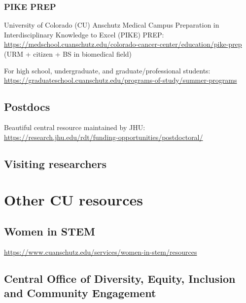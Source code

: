 \documentclass[
  letterpaper,
  DIV=11,
  numbers=noendperiod]{scrreprt}
\begin{document}
\hypertarget{pike-prep}{%
\subsection{PIKE PREP}\label{pike-prep}}

University of Colorado (CU) Anschutz Medical Campus Preparation in
Interdisciplinary Knowledge to Excel (PIKE) PREP:
\url{https://medschool.cuanschutz.edu/colorado-cancer-center/education/pike-prep}
(URM + citizen + BS in biomedical field)

For high school, undergraduate, and graduate/professional students:
\url{https://graduateschool.cuanschutz.edu/programs-of-study/summer-programs}

\hypertarget{postdocs}{%
\section{Postdocs}\label{postdocs}}

Beautiful central resource maintained by JHU:
\url{https://research.jhu.edu/rdt/funding-opportunities/postdoctoral/}

\hypertarget{visiting-researchers}{%
\section{Visiting researchers}\label{visiting-researchers}}


\hypertarget{other-cu-resources}{%
\chapter{Other CU resources}\label{other-cu-resources}}

\hypertarget{women-in-stem}{%
\section{Women in STEM}\label{women-in-stem}}

\url{https://www.cuanschutz.edu/services/women-in-stem/resources}

\hypertarget{central-office-of-diversity-equity-inclusion-and-community-engagement}{%
\section{Central Office of Diversity, Equity, Inclusion and Community
Engagement}\label{central-office-of-diversity-equity-inclusion-and-community-engagement}}
\end{document}
